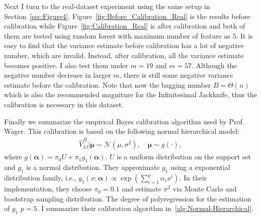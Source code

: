 \documentclass[11pt]{article}
\begin{document}
Next I turn to the real-dataset experiment using the same setup in Section~\ref{sec:Figure4}.
Figure~\ref{fig:Before_Calibration_Real} is the results before calibration while Figure~\ref{fig:Calibration_Real} is after calibration and both of them are tested using random forest with maximum number of feature as $5$.
It is easy to find that the variance estimate before calibration has a lot of negative number, which are invalid.
Instead, after calibration, all the variance estimate becomes positive.
I also test them under $m=19$ and $m=57$.
Although the negative number decrease in larger $m$, there is still some negative variance estimate before the calibration.
Note that now the bagging number $B=\Theta(n)$ which is also the recommended magniture for the Infinitesimal Jackknife, thus the calibration is necessary in this dataset.

Finally we summarize the empirical Bayes calibration algorithm used by Prof. Wager. This calibration is based on the following normal hierarchical model: 
\begin{align*}
	\hat{V}_{IJ}^B\lvert \boldsymbol{\mu} \sim \mathcal{N}(\mu, \sigma^2), \quad \boldsymbol{\mu}\sim g(\cdot),
\end{align*}
where $g(\boldsymbol{\alpha})=\pi_0 U + \pi_1 g_1(\boldsymbol{\alpha})$. $U$ is a uniform distribution on the support set and $g_1$ is a normal distribution.
They approximate $g_1$ using a exponential distribution family, i.e., $g_1(x;\boldsymbol{\alpha})\propto \exp(\sum_{i=1}^p \alpha_i x^i)$.
In their implementation, they choose $\pi_0=0.1$ and estimate $\sigma^2$ via Monte Carlo and bootstrap sampling distribution.
The degree of polyregression for the estimation of $g_1$ $p=5$. 
I summarize their calibration algorithm in~\ref{alg:Normal-Hierarchical}.
\end{document}
